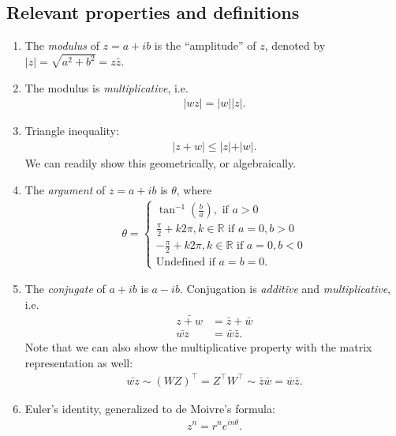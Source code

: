 \documentclass{article}
\theoremstyle{definition}
\newcommand{\R}{\mathbb{R}}
\begin{document}
\subsection{Relevant properties and definitions}
\begin{enumerate}
	\item The \textit{modulus} of $z = a+ib$ is the ``amplitude'' of $z$, denoted by $\vert z \vert = \sqrt{a^2 + b^2} = z\bar{z}$. 
	\item The modulus is \textit{multiplicative}, i.e. 
	\begin{align*}
	\vert wz \vert = \vert w \vert \vert z \vert.
	\end{align*}
	\item Triangle inequality:
	\begin{align*}
	\vert z + w \vert \leq \vert z \vert + \vert w \vert.
	\end{align*}
	We can readily show this geometrically, or algebraically. 
	\item The \textit{argument} of $z = a+ib$ is $\theta$, where
	\begin{align*}
	\theta = 
	\begin{cases}
	\tan^{-1}\left( \frac{b}{a}\right), \text{ if } a > 0\\
	\frac{\pi}{2} + k2\pi, k\in\R \text{ if } a = 0, b > 0\\
	-\frac{\pi}{2} + k2\pi, k\in\R \text{ if } a = 0, b < 0\\
	\text{Undefined if } a=b=0.
	\end{cases}
	\end{align*} 
	\item The \textit{conjugate} of $a+ib$ is $a-ib$. Conjugation is \textit{additive} and \textit{multiplicative}, i.e.
	\begin{align*}
	\bar{z+w} &= \bar{z} + \bar{w}\\
	\bar{wz} &= \bar{w}\bar{z}.
	\end{align*}
	Note that we can also show the multiplicative property with the matrix representation as well:
	\begin{align*}
	\bar{wz} \sim (WZ)^\top = Z^\top W^\top \sim \bar{z}\bar{w} = \bar{w}\bar{z}.
	\end{align*}
	\item Euler's identity, generalized to de Moivre's formula:
	\begin{align*}
	z^n = r^ne^{in\theta}.
	\end{align*}
\end{enumerate}
\end{document}
